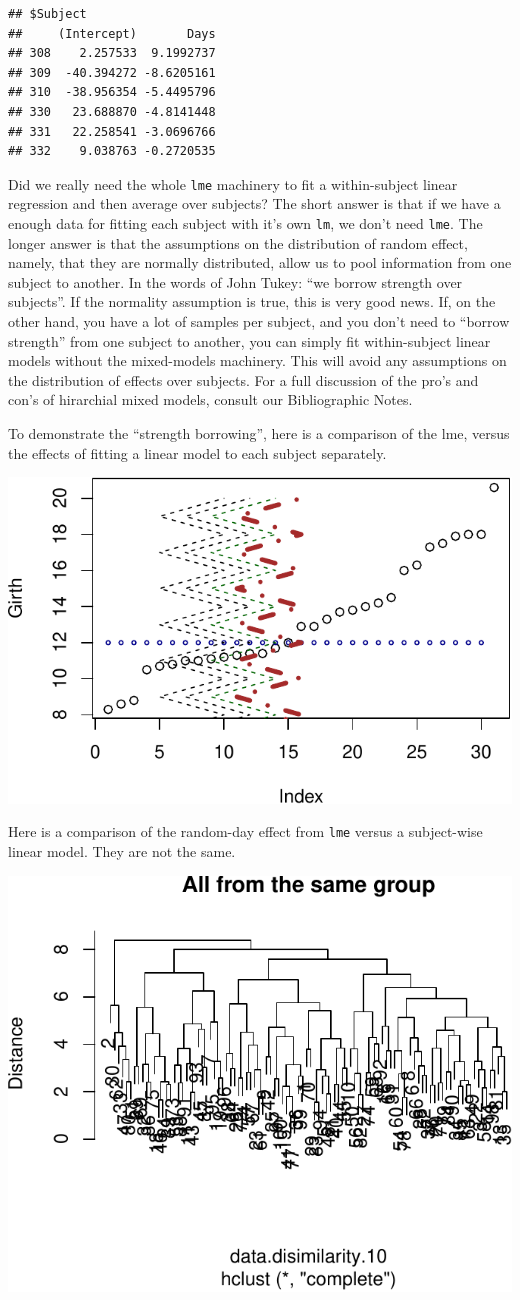 \documentclass[]{book}
\theoremstyle{definition}
\theoremstyle{definition}
\theoremstyle{definition}
\theoremstyle{remark}
\begin{document}
\begin{verbatim}
## $Subject
##     (Intercept)       Days
## 308    2.257533  9.1992737
## 309  -40.394272 -8.6205161
## 310  -38.956354 -5.4495796
## 330   23.688870 -4.8141448
## 331   22.258541 -3.0696766
## 332    9.038763 -0.2720535
\end{verbatim}

Did we really need the whole \texttt{lme} machinery to fit a within-subject linear regression and then average over subjects?
The short answer is that if we have a enough data for fitting each subject with it's own \texttt{lm}, we don't need \texttt{lme}.
The longer answer is that the assumptions on the distribution of random effect, namely, that they are normally distributed, allow us to pool information from one subject to another.
In the words of John Tukey: ``we borrow strength over subjects''.
If the normality assumption is true, this is very good news.
If, on the other hand, you have a lot of samples per subject, and you don't need to ``borrow strength'' from one subject to another, you can simply fit within-subject linear models without the mixed-models machinery.
This will avoid any assumptions on the distribution of effects over subjects.
For a full discussion of the pro's and con's of hirarchial mixed models, consult our Bibliographic Notes.

To demonstrate the ``strength borrowing'', here is a comparison of the lme, versus the effects of fitting a linear model to each subject separately.

\includegraphics[width=0.5\linewidth]{Rcourse_files/figure-latex/unnamed-chunk-203-1}

Here is a comparison of the random-day effect from \texttt{lme} versus a subject-wise linear model. They are not the same.

\includegraphics[width=0.5\linewidth]{Rcourse_files/figure-latex/unnamed-chunk-204-1}
\end{document}
